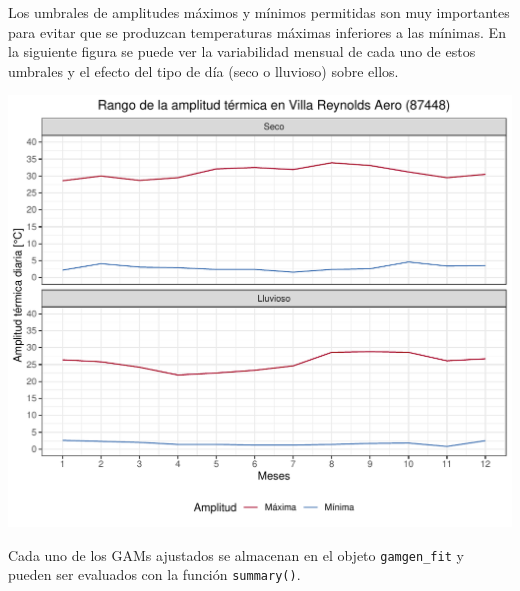 \documentclass[
]{article}
\newenvironment{Shaded}{}{}
\newcommand{\DataTypeTok}[1]{\textcolor[rgb]{0.56,0.13,0.00}{#1}}
\newcommand{\KeywordTok}[1]{\textcolor[rgb]{0.00,0.44,0.13}{\textbf{#1}}}
\newcommand{\NormalTok}[1]{#1}
\newcommand{\OperatorTok}[1]{\textcolor[rgb]{0.40,0.40,0.40}{#1}}
\newcommand{\StringTok}[1]{\textcolor[rgb]{0.25,0.44,0.63}{#1}}
\begin{document}
Los umbrales de amplitudes máximos y mínimos permitidas son muy importantes para evitar que se produzcan temperaturas máximas inferiores a las mínimas. En la siguiente figura se puede ver la variabilidad mensual de cada uno de estos umbrales y el efecto del tipo de día (seco o lluvioso) sobre ellos.

\begin{center}\includegraphics{Webinario_Generador_files/figure-latex/unnamed-chunk-15-1} \end{center}

Cada uno de los GAMs ajustados se almacenan en el objeto \texttt{gamgen\_fit} y pueden ser evaluados con la función \texttt{summary()}.

\begin{Shaded}
\end{Shaded}
\end{document}
